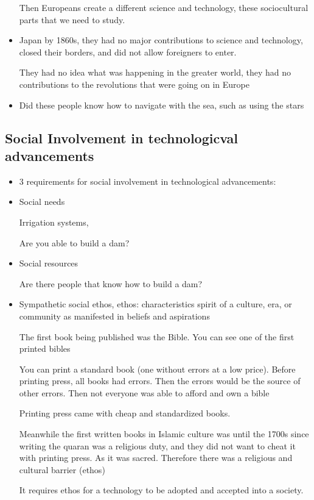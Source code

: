 \documentclass{article}
\begin{document}
\begin{itemize}
    Then Europeans create a different science and technology, these sociocultural
    parts that we need to study.
  \item Japan by 1860s, they had no major contributions to science and technology,
    closed their borders, and did not allow foreigners to enter.

    They had no idea what was happening in the greater world,
    they had no contributions to the revolutions that were going on in Europe
  \item Did these people know how to navigate with the sea, such
    as using the stars
\end{itemize}

\subsection{Social Involvement in technologicval advancements}
\begin{itemize}
  \item 3 requirements for social involvement in technological advancements:
  \item Social needs

   Irrigation systems,

  Are you able to build a dam?
  \item Social resources

    Are there people that know how to build a dam?
  \item Sympathetic social ethos,
    ethos: characteristics spirit of a culture, era, or community as manifested in beliefs and aspirations

    The first book being published was the Bible.
    You can see one of the first printed bibles

    You can print a standard book (one without errors at a low price).
    Before printing press, all books had errors. Then the errors
    would be the source of other errors. Then not everyone was able to afford and own a bible

    Printing press came with cheap and standardized books.

    Meanwhile the first written books in Islamic culture was until the 1700s since
    writing the quaran was a religious duty, and they did not want to cheat it with printing press.
    As it was sacred. Therefore there was a religious and cultural barrier (ethos)

    It requires ethos for a technology to be adopted and accepted into a society.
\end{itemize}
\end{document}
